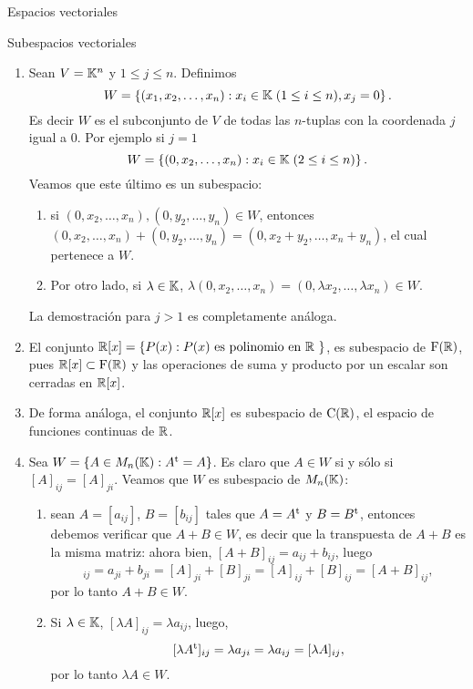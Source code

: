 \begin{chapter}{Espacios vectoriales}
\begin{section}{Subespacios vectoriales}
\begin{ejemplo*}
\begin{enumerate}
        
        \item Sean $V=\mathbb K^n$ y $1\le j \le n$. Definimos 
        $$
        W = \left\{ (x_1,x_2,\ldots,x_n): x_i \in \mathbb K\; (1 \le i \le n), x_j =0\right\}.
        $$
        Es decir $W$  es el subconjunto de $V$ de todas las $n$-tuplas con la coordenada $j$ igual a 0. Por ejemplo  si $j=1$ 
        $$
        W = \left\{ (0,x_2,\ldots,x_n): x_i \in \mathbb K \;(2 \le i \le n)\right\}.
        $$
        Veamos que este último es un subespacio: 
        \begin{enumerate}
            \item si $(0,x_2,\ldots,x_n), (0,y_2,\ldots,y_n) \in W$,  entonces
            $(0,x_2,\ldots,x_n)+ (0,y_2,\ldots,y_n) = (0,x_2+y_2,\ldots,x_n+y_n)$, el cual pertenece a $W$. 
            \item 	Por otro lado, si $\lambda \in \mathbb K$, $\lambda(0,x_2,\ldots,x_n) = (0,\lambda x_2,\ldots,\lambda x_n) \in W$.
        \end{enumerate}
        La demostración para $j >1$ es completamente análoga. 
        \item El  conjunto $\mathbb R[x] = \left\{P(x): P(x) \text{ es polinomio en $\mathbb R$ } \right\}$, es subespacio de $\operatorname{F}(\mathbb R)$, pues $\mathbb R[x] \subset \operatorname{F}(\mathbb R)$ y las operaciones de suma y producto por un escalar son cerradas en $\mathbb R[x]$.
        \item De forma análoga, el conjunto $\mathbb R[x]$ es subespacio de $\operatorname{C}(\mathbb R)$,  el espacio de funciones continuas de  $\mathbb R$.
        \item Sea $W= \left\{A \in M_n(\mathbb K): A^{\operatorname{t}} = A \right\}$. Es claro que  $A \in W$ si y sólo si $[A]_{ij} = [A]_{ji}$. Veamos que  $W$ es subespacio de $M_n(\mathbb K)$: 
        \begin{enumerate}
            \item sean $A=[a_{ij}]$, $B= [b_{ij}]$ tales que $A=A^{\operatorname{t}}$ y $B=B^{\operatorname{t}}$, entonces debemos verificar que $A+ B \in W$,  es decir que la transpuesta de $A+B$  es la misma matriz: ahora bien, $[A+B]_{ij} = a_{ij}+b_{ij}$, luego 
            \begin{equation*}
                [(A+B)^\t]_{ij} =a_{ji}+b_{ji} = [A]_{ji} + [B]_{ji} = [A]_{ij} + [B]_{ij} = [A+B]_{ij},
            \end{equation*}
            por lo tanto $A+B \in W$.
            \item Si $\lambda \in \mathbb K$, $[\lambda A]_{ij} = \lambda a_{ij}$, luego, 
            $$
            [\lambda A^{\operatorname{t}}]_{ij} = \lambda a_{ji} = \lambda a_{ij} = [\lambda A]_{ij},
            $$
            por lo tanto $\lambda A \in W$.
        \end{enumerate} 	


\end{enumerate}
\end{ejemplo*}
\end{section}
\end{chapter}
